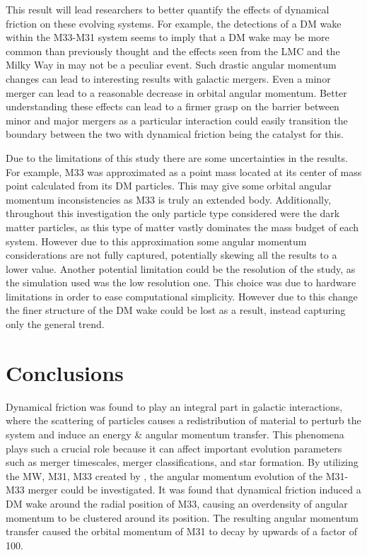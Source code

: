 \documentclass[fleqn,usenatbib]{mnras}
\begin{document}
\vspace{10pt}

This result will lead researchers to better quantify the effects of dynamical friction on these evolving systems. For example, the detections of a DM wake within the M33-M31 system seems to imply that a DM wake may be more common than previously thought and the effects seen from the LMC and the Milky Way in \citep{Garavito-Camargo_2019} may not be a peculiar event. Such drastic angular momentum changes can lead to interesting results with galactic mergers. Even a minor merger can lead to a reasonable decrease in orbital angular momentum. Better understanding these effects can lead to a firmer grasp on the barrier between minor and major mergers as a particular interaction could easily transition the boundary between the two with dynamical friction being the catalyst for this. 

\vspace{10pt}

Due to the limitations of this study there are some uncertainties in the results. For example, M33 was approximated as a point mass located at its center of mass point calculated from its DM particles. This may give some orbital angular momentum inconsistencies as M33 is truly an extended body. Additionally, throughout this investigation the only particle type considered were the dark matter particles, as this type of matter vastly dominates the mass budget of each system. However due to this approximation some angular momentum considerations are not fully captured, potentially skewing all the results to a lower value. Another potential limitation could be the resolution of the study, as the simulation used was the low resolution one. This choice was due to hardware limitations in order to ease computational simplicity. However due to this change the finer structure of the DM wake could be lost as a result, instead capturing only the general trend.  


\section{Conclusions}
Dynamical friction was found to play an integral part in galactic interactions, where the scattering of particles causes a redistribution of material to perturb the system and induce an energy \& angular momentum transfer. This phenomena plays such a crucial role because it can affect important evolution parameters such as merger timescales, merger classifications, and star formation. By utilizing the MW, M31, M33 created by \citep{vandermarel2012}, the angular momentum evolution of the M31-M33 merger could be investigated. It was found that dynamical friction induced a DM wake around the radial position of M33, causing an overdensity of angular momentum to be clustered around its position. The resulting angular momentum transfer caused the orbital momentum of M31 to decay by upwards of a factor of 100. 
\end{document}
